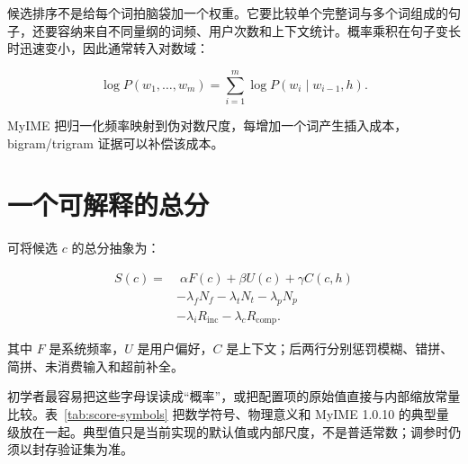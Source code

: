 候选排序不是给每个词拍脑袋加一个权重。它要比较单个完整词与多个词组成的句子，还要容纳来自不同量纲的词频、用户次数和上下文统计。概率乘积在句子变长时迅速变小，因此通常转入对数域：

\[
\log P(w_1,\ldots,w_m)=\sum_{i=1}^{m}\log P(w_i\mid w_{i-1},h).
\]

MyIME 把归一化频率映射到伪对数尺度，每增加一个词产生插入成本，bigram/trigram 证据可以补偿该成本。



\section{一个可解释的总分}

可将候选 \(c\) 的总分抽象为：

\begin{align*}
S(c)=&\;\alpha F(c)+\beta U(c)+\gamma C(c,h)\\
&-\lambda_fN_f-\lambda_tN_t-\lambda_pN_p\\
&-\lambda_iR_{\mathrm{inc}}-\lambda_cR_{\mathrm{comp}}.
\end{align*}

其中 \(F\) 是系统频率，\(U\) 是用户偏好，\(C\) 是上下文；后两行分别惩罚模糊、错拼、简拼、未消费输入和超前补全。

初学者最容易把这些字母误读成“概率”，或把配置项的原始值直接与内部缩放常量比较。表~\ref{tab:score-symbols} 把数学符号、物理意义和 MyIME 1.0.10 的典型量级放在一起。典型值只是当前实现的默认值或内部尺度，不是普适常数；调参时仍须以封存验证集为准。

